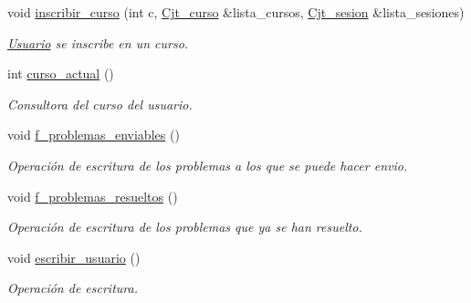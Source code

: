 \begin{DoxyCompactItemize}
void \mbox{\hyperlink{class_usuario_ae2ebc16b4ed5e80451ca8ae12f0c8209}{inscribir\+\_\+curso}} (int c, \mbox{\hyperlink{class_cjt__curso}{Cjt\+\_\+curso}} \&lista\+\_\+cursos, \mbox{\hyperlink{class_cjt__sesion}{Cjt\+\_\+sesion}} \&lista\+\_\+sesiones)
\begin{DoxyCompactList}\small\item\em \mbox{\hyperlink{class_usuario}{Usuario}} se inscribe en un curso. \end{DoxyCompactList}\item 
int \mbox{\hyperlink{class_usuario_ad4813c66cba2cb678522cefd3491e6c0}{curso\+\_\+actual}} ()
\begin{DoxyCompactList}\small\item\em Consultora del curso del usuario. \end{DoxyCompactList}\item 
void \mbox{\hyperlink{class_usuario_a11ee6d52132455ed32f3df6824c7b9c5}{f\+\_\+problemas\+\_\+enviables}} ()
\begin{DoxyCompactList}\small\item\em Operación de escritura de los problemas a los que se puede hacer envio. \end{DoxyCompactList}\item 
void \mbox{\hyperlink{class_usuario_a6f504aa9a6cb6467e02a01b40951b31c}{f\+\_\+problemas\+\_\+resueltos}} ()
\begin{DoxyCompactList}\small\item\em Operación de escritura de los problemas que ya se han resuelto. \end{DoxyCompactList}\item 
void \mbox{\hyperlink{class_usuario_a501a484852ba4eca86c0e78f246c87e9}{escribir\+\_\+usuario}} ()
\begin{DoxyCompactList}\small\item\em Operación de escritura. \end{DoxyCompactList}\end{DoxyCompactItemize}
